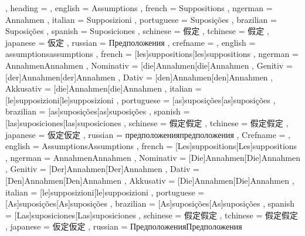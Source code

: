   {
    , heading =   {
                    , english     = Assumptions
                    , french      = Suppositions
                    , ngerman     = Annahmen
                    , italian     = Supposizioni
                    , portuguese  = Suposições
                    , brazilian   = Suposições
                    , spanish     = Suposiciones
                    , schinese    = 假定
                    , tchinese    = 假定
                    , japanese    = 仮定
                    , russian     = Предположения
                  }
    , crefname =  {
                    , english     = {assumptions}{assumptions}
                    , french      = [les]{suppositions}[les]{suppositions}
                    , ngerman     = { {Annahmen}{Annahmen}
                                      , Nominativ = [die]{Annahmen}[die]{Annahmen}
                                      , Genitiv   = [der]{Annahmen}[der]{Annahmen}
                                      , Dativ     = [den]{Annahmen}[den]{Annahmen}
                                      , Akkusativ = [die]{Annahmen}[die]{Annahmen}
                                    }
                    , italian     = [le]{supposizioni}[le]{supposizioni}
                    , portuguese  = [as]{suposições}[as]{suposições}
                    , brazilian   = [as]{suposições}[as]{suposições}
                    , spanish     = [las]{suposiciones}[las]{suposiciones}
                    , schinese    = {假定}{假定}
                    , tchinese    = {假定}{假定}
                    , japanese    = {仮定}{仮定}
                    , russian     = {предположения}{предположения}
                  }
    , Crefname =  {
                    , english     = {Assumptions}{Assumptions}
                    , french      = [Les]{suppositions}[Les]{suppositions}
                    , ngerman     = { {Annahmen}{Annahmen}
                                      , Nominativ = [Die]{Annahmen}[Die]{Annahmen}
                                      , Genitiv   = [Der]{Annahmen}[Der]{Annahmen}
                                      , Dativ     = [Den]{Annahmen}[Den]{Annahmen}
                                      , Akkusativ = [Die]{Annahmen}[Die]{Annahmen}
                                    }
                    , italian     = [le]{supposizioni}[le]{supposizioni}
                    , portuguese  = [As]{suposições}[As]{suposições}
                    , brazilian   = [As]{suposições}[As]{suposições}
                    , spanish     = [Las]{suposiciones}[Las]{suposiciones}
                    , schinese    = {假定}{假定}
                    , tchinese    = {假定}{假定}
                    , japanese    = {仮定}{仮定}
                    , russian     = {Предположения}{Предположения}
                  }
  }


